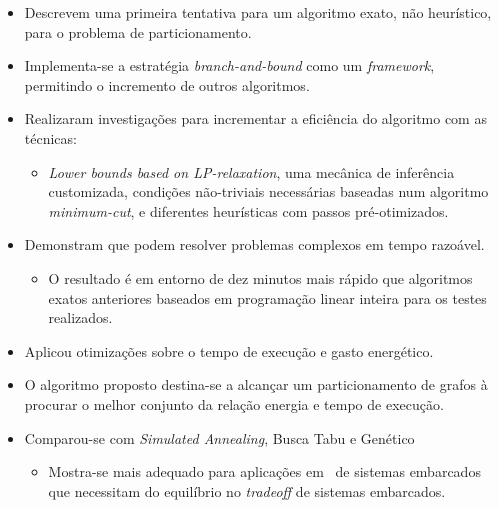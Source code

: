    \begin{frame}{\cite{Mann2007}} \vspace{-1em}
      \begin{itemize}
         \setlength{\itemsep}{1.2em}
         \item Descrevem uma primeira tentativa para um algoritmo exato, não heurístico, para o problema de particionamento. 
         
         \item Implementa-se a estratégia \textit{branch-and-bound} como um \textit{framework}, permitindo o incremento de outros algoritmos. 
         
         \item Realizaram investigações para incrementar a eficiência do algoritmo com as técnicas:
         \begin{itemize}
            \item \textit{Lower bounds based on LP-relaxation}, uma mecânica de inferência customizada, condições não-triviais necessárias baseadas num algoritmo \textit{minimum-cut}, e diferentes heurísticas com passos pré-otimizados. 
         \end{itemize}
      
         \item Demonstram que podem resolver problemas complexos em tempo razoável. 
         \begin{itemize}
            \item O resultado é em entorno de dez minutos mais rápido que algoritmos exatos anteriores baseados em programação linear inteira para os testes realizados.
         \end{itemize}
      \end{itemize}
   \end{frame}
   
   \begin{frame}{\cite{Hassine2017}} \vspace{-1em}
      \begin{itemize}
         \setlength{\itemsep}{1.5em}
         \item Aplicou otimizações sobre o tempo de execução e gasto energético.
         
         \item O algoritmo proposto destina-se a alcançar um particionamento de grafos à procurar o melhor conjunto da relação energia e tempo de execução.
         
         \item Comparou-se com \textit{Simulated Annealing}, Busca Tabu e Genético
         \begin{itemize}
            \item Mostra-se mais adequado para aplicações em \cores\ de sistemas embarcados que necessitam do equilíbrio no \textit{tradeoff} de sistemas embarcados.
         \end{itemize}
         
      \end{itemize}
   \end{frame}
   
